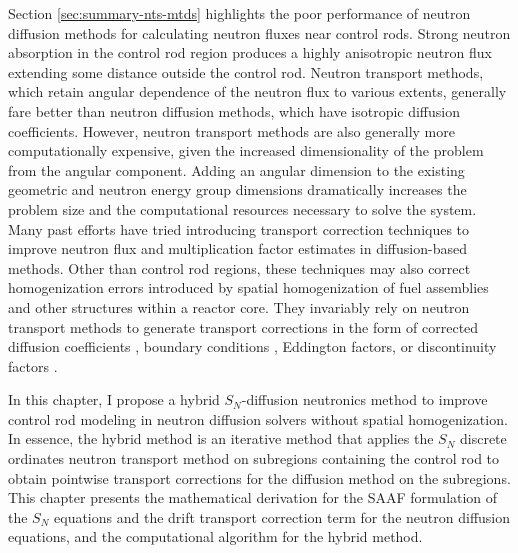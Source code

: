 Section \ref{sec:summary-nts-mtds} highlights the poor performance of neutron diffusion
methods for calculating neutron fluxes near control rods. Strong neutron absorption in the control
rod region produces a highly anisotropic neutron flux extending some distance outside the control
rod. Neutron transport methods, which retain angular dependence of the neutron flux to various
extents, generally fare better than neutron diffusion methods, which have isotropic diffusion
coefficients. However, neutron transport methods are also generally more computationally expensive,
given the increased dimensionality of the problem from the angular component. Adding an angular
dimension to the existing geometric and neutron energy group dimensions dramatically
increases the problem size and the computational resources necessary to solve the system. Many past
efforts have tried introducing
transport correction techniques to improve neutron flux and multiplication factor estimates in
diffusion-based methods. Other than control rod regions, these techniques may also correct
homogenization errors introduced by spatial homogenization of fuel assemblies and other
structures within a reactor core. They invariably rely on neutron transport methods to generate
transport corrections in the form of corrected diffusion coefficients
\cite{bretscher_computing_1997, scherer_determination_1976, ronen_accurate_2004,
pounders_diffusion_2009, kavenoky_sph_1978}, boundary conditions \cite{davison_influence_1951,
pellaud_extrapolation_1968, fen_modelling_1992}, Eddington factors, or discontinuity factors
\cite{koebke_new_1980}.

In this chapter, I propose a hybrid $S_N$-diffusion neutronics method to improve control rod
modeling in neutron diffusion solvers without spatial homogenization. In essence, the hybrid
method is an iterative method that applies
the $S_N$ discrete ordinates neutron transport method on subregions containing the control rod to
obtain pointwise transport corrections for the diffusion method on the subregions.
This chapter presents the mathematical derivation for the
\gls{SAAF} formulation of the $S_N$ equations and the drift transport correction term for the
neutron diffusion equations, and the computational algorithm for the hybrid method.


